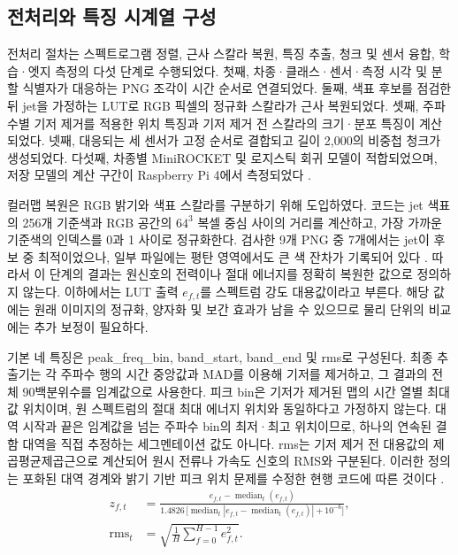 \documentclass[11pt,a4paper]{article}
\newcommand{\sourceproject}{\citep{project2026}}
\begin{document}
\subsection{전처리와 특징 시계열 구성}
전처리 절차는 스펙트로그램 정렬, 근사 스칼라 복원, 특징 추출, 청크 및 센서 융합, 학습·엣지 측정의 다섯 단계로 수행되었다.
첫째, 차종·클래스·센서·측정 시각 및 분할 식별자가 대응하는 PNG 조각이 시간 순서로 연결되었다.
둘째, 색표 후보를 점검한 뒤 jet을 가정하는 LUT로 RGB 픽셀의 정규화 스칼라가 근사 복원되었다.
셋째, 주파수별 기저 제거를 적용한 위치 특징과 기저 제거 전 스칼라의 크기·분포 특징이 계산되었다.
넷째, 대응되는 세 센서가 고정 순서로 결합되고 길이 2,000의 비중첩 청크가 생성되었다.
다섯째, 차종별 MiniROCKET 및 로지스틱 회귀 모델이 적합되었으며, 저장 모델의 계산 구간이 Raspberry Pi 4에서 측정되었다 \sourceproject.

컬러맵 복원은 RGB 밝기와 색표 스칼라를 구분하기 위해 도입하였다.
코드는 jet 색표의 256개 기준색과 RGB 공간의 $64^3$ 복셀 중심 사이의 거리를 계산하고, 가장 가까운 기준색의 인덱스를 0과 1 사이로 정규화한다.
검사한 9개 PNG 중 7개에서는 jet이 후보 중 최적이었으나, 일부 파일에는 평탄 영역에서도 큰 색 잔차가 기록되어 있다 \sourceproject.
따라서 이 단계의 결과는 원신호의 전력이나 절대 에너지를 정확히 복원한 값으로 정의하지 않는다.
이하에서는 LUT 출력 $e_{f,t}$를 스펙트럼 강도 대용값이라고 부른다.
해당 값에는 원래 이미지의 정규화, 양자화 및 보간 효과가 남을 수 있으므로 물리 단위의 비교에는 추가 보정이 필요하다.

기본 네 특징은 peak\_freq\_bin, band\_start, band\_end 및 rms로 구성된다.
최종 추출기는 각 주파수 행의 시간 중앙값과 MAD를 이용해 기저를 제거하고, 그 결과의 전체 90백분위수를 임계값으로 사용한다.
피크 bin은 기저가 제거된 맵의 시간 열별 최대값 위치이며, 원 스펙트럼의 절대 최대 에너지 위치와 동일하다고 가정하지 않는다.
대역 시작과 끝은 임계값을 넘는 주파수 bin의 최저·최고 위치이므로, 하나의 연속된 결함 대역을 직접 추정하는 세그멘테이션 값도 아니다.
rms는 기저 제거 전 대용값의 제곱평균제곱근으로 계산되어 원시 전류나 가속도 신호의 RMS와 구분된다.
이러한 정의는 포화된 대역 경계와 밝기 기반 피크 위치 문제를 수정한 현행 코드에 따른 것이다 \sourceproject.
\begin{align}
 z_{f,t}&=\frac{e_{f,t}-\operatorname{median}_{t}(e_{f,t})}
 {1.4826\,\big[\operatorname{median}_{t}|e_{f,t}-\operatorname{median}_{t}(e_{f,t})|+10^{-6}\big]},\\
 \mathrm{rms}_t&=\sqrt{\frac{1}{H}\sum_{f=0}^{H-1}e_{f,t}^{2}}.
\end{align}
\end{document}
